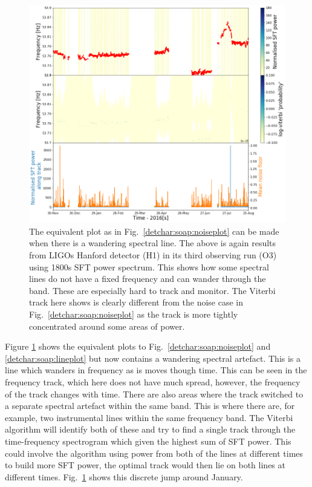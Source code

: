 %
\begin{figure}[hpt]
	\centering
	\includegraphics[width=\textwidth]{C6_detchar/track_F53_7_53_9_wander.png}
	\caption[Example SOAP output for wandering line.]{The equivalent plot as in Fig.~\ref{detchar:soap:noiseplot} can be made when there is a wandering spectral line. The above is again results from \glspl{LIGO} Hanford detector (H1) in its third observing run (O3) using 1800s \gls{SFT} power spectrum. This shows how some spectral lines do not have a fixed frequency and can wander through the band. These are especially hard to track and monitor. The Viterbi track here shows is clearly different from the noise case in Fig.~\ref{detchar:soap:noiseplot} as the track is more tightly concentrated around some areas of power. }
	\label{detchar:soap:wanderplot}
\end{figure}
%

Figure \ref{detchar:soap:wanderplot} shows the equivalent plots to
Fig.~\ref{detchar:soap:noiseplot} and \ref{detchar:soap:lineplot} but now
contains a wandering spectral artefact.  This is
a line which wanders in
frequency as is moves though time.  This can be seen in the frequency
track, which here does not have much spread, however, the frequency of the
track changes with time.  There are also areas where the track switched to a separate spectral artefact within the same
band. This is where there are, for example, two instrumental lines within the same frequency band. The Viterbi algorithm will identify both of these and try to find a single track through the time-frequency spectrogram which given the highest sum of \gls{SFT} power. This could involve the algorithm using power from both of the lines at different times to build more \gls{SFT} power, the optimal track would then lie on both lines at different times. Fig.~\ref{detchar:soap:wanderplot} shows this discrete jump around
January.~ 

